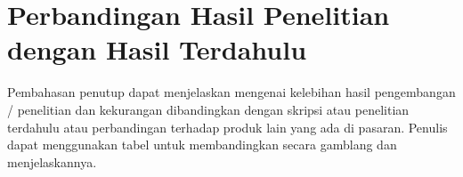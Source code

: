\section{Perbandingan Hasil Penelitian dengan Hasil Terdahulu}

Pembahasan penutup dapat menjelaskan mengenai kelebihan hasil pengembangan / penelitian dan kekurangan dibandingkan dengan skripsi atau penelitian terdahulu
atau perbandingan terhadap produk lain yang ada di pasaran. Penulis dapat menggunakan tabel untuk membandingkan secara gamblang dan menjelaskannya.